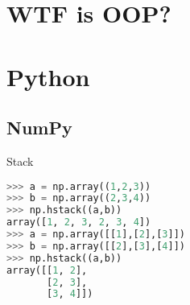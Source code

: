 \documentclass[main.tex]{subfiles}
\begin{document}
\section{WTF is OOP?}

\section{Python}

\subsection{NumPy}

\begin{frame}[fragile]{Stack}
\begin{lstlisting}[language=Python]
>>> a = np.array((1,2,3))
>>> b = np.array((2,3,4))
>>> np.hstack((a,b))
array([1, 2, 3, 2, 3, 4])
>>> a = np.array([[1],[2],[3]])
>>> b = np.array([[2],[3],[4]])
>>> np.hstack((a,b))
array([[1, 2],
       [2, 3],
       [3, 4]])
\end{lstlisting}
\end{frame}
\end{document}
